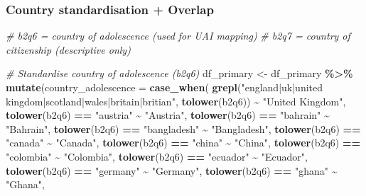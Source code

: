 \documentclass[
]{article}
\newenvironment{Shaded}{\begin{snugshade}}{\end{snugshade}}
\newcommand{\AttributeTok}[1]{\textcolor[rgb]{0.13,0.29,0.53}{#1}}
\newcommand{\CommentTok}[1]{\textcolor[rgb]{0.56,0.35,0.01}{\textit{#1}}}
\newcommand{\FunctionTok}[1]{\textcolor[rgb]{0.13,0.29,0.53}{\textbf{#1}}}
\newcommand{\NormalTok}[1]{#1}
\newcommand{\OtherTok}[1]{\textcolor[rgb]{0.56,0.35,0.01}{#1}}
\newcommand{\SpecialCharTok}[1]{\textcolor[rgb]{0.81,0.36,0.00}{\textbf{#1}}}
\newcommand{\StringTok}[1]{\textcolor[rgb]{0.31,0.60,0.02}{#1}}
\begin{document}
\subsubsection{Country standardisation +
Overlap}\label{country-standardisation-overlap}

\begin{Shaded}
\begin{Highlighting}[]
\CommentTok{\# b2q6 = country of adolescence (used for UAI mapping)}
\CommentTok{\# b2q7 = country of citizenship (descriptive only)}

\CommentTok{\# Standardise country of adolescence (b2q6)}
\NormalTok{df\_primary }\OtherTok{\textless{}{-}}\NormalTok{ df\_primary }\SpecialCharTok{\%\textgreater{}\%}
  \FunctionTok{mutate}\NormalTok{(}\AttributeTok{country\_adolescence =} \FunctionTok{case\_when}\NormalTok{(}
    \FunctionTok{grepl}\NormalTok{(}\StringTok{"england|uk|united kingdom|scotland|wales|britain|britian"}\NormalTok{,}
          \FunctionTok{tolower}\NormalTok{(b2q6)) }\SpecialCharTok{\textasciitilde{}} \StringTok{"United Kingdom"}\NormalTok{,}
    \FunctionTok{tolower}\NormalTok{(b2q6) }\SpecialCharTok{==} \StringTok{"austria"}                        \SpecialCharTok{\textasciitilde{}} \StringTok{"Austria"}\NormalTok{,}
    \FunctionTok{tolower}\NormalTok{(b2q6) }\SpecialCharTok{==} \StringTok{"bahrain"}                        \SpecialCharTok{\textasciitilde{}} \StringTok{"Bahrain"}\NormalTok{,}
    \FunctionTok{tolower}\NormalTok{(b2q6) }\SpecialCharTok{==} \StringTok{"bangladesh"}                     \SpecialCharTok{\textasciitilde{}} \StringTok{"Bangladesh"}\NormalTok{,}
    \FunctionTok{tolower}\NormalTok{(b2q6) }\SpecialCharTok{==} \StringTok{"canada"}                         \SpecialCharTok{\textasciitilde{}} \StringTok{"Canada"}\NormalTok{,}
    \FunctionTok{tolower}\NormalTok{(b2q6) }\SpecialCharTok{==} \StringTok{"china"}                          \SpecialCharTok{\textasciitilde{}} \StringTok{"China"}\NormalTok{,}
    \FunctionTok{tolower}\NormalTok{(b2q6) }\SpecialCharTok{==} \StringTok{"colombia"}                       \SpecialCharTok{\textasciitilde{}} \StringTok{"Colombia"}\NormalTok{,}
    \FunctionTok{tolower}\NormalTok{(b2q6) }\SpecialCharTok{==} \StringTok{"ecuador"}                        \SpecialCharTok{\textasciitilde{}} \StringTok{"Ecuador"}\NormalTok{,}
    \FunctionTok{tolower}\NormalTok{(b2q6) }\SpecialCharTok{==} \StringTok{"germany"}                        \SpecialCharTok{\textasciitilde{}} \StringTok{"Germany"}\NormalTok{,}
    \FunctionTok{tolower}\NormalTok{(b2q6) }\SpecialCharTok{==} \StringTok{"ghana"}                          \SpecialCharTok{\textasciitilde{}} \StringTok{"Ghana"}\NormalTok{,}

\end{Highlighting}
\end{Shaded}
\end{document}
